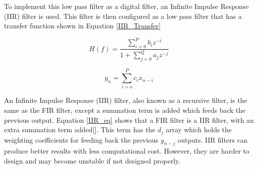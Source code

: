 


To implement this low pass filter as a digital filter, an Infinite Impulse Response (IIR) filter is used.  This filter is then configured as a low pass filter that has a transfer function shown in Equation \ref{IIR_Transfer}

\begin{equation}\label{IIR_Transfer}
H(f)=\frac{\displaystyle\sum\limits_{i=0}^{P} b_i z^{-i}}{1+\displaystyle\sum\limits_{j=0}^{Q} a_j z^{-j}}
\end{equation}


\begin{equation}\label{FIR_Eq}
y_n=\displaystyle\sum\limits_{i=o}^{P} c_ix_{n-i}
\end{equation} 

An Infinite Impulse Response (IIR) filter, also known as a recursive filter, is the same as the FIR filter, except a summation term is added which feeds back the previous output.  Equation \ref{IIR_eq} shows that a FIR filter is a IIR filter, with an extra summation term added[\cite{Cross}]. This term has the $d_j$ array which holds the weighting coefficients for feeding back the previous $y_{n-j}$ outputs.  IIR filters can produce better results with less computational cost.  However, they are harder to design and may become unstable if not designed properly.

